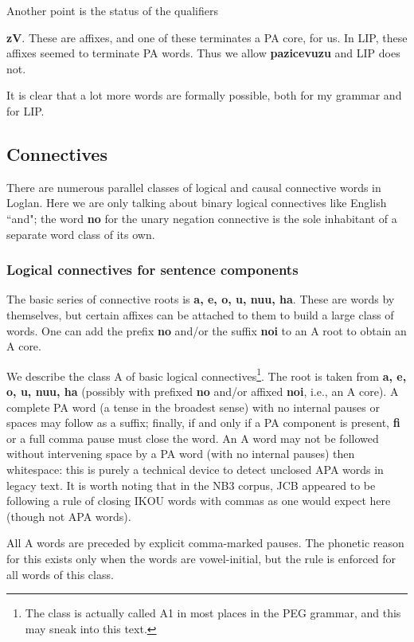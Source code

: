 \documentclass[12pt]{book}
\begin{document}
Another point is the status of the qualifiers {{\bf zV}.   These are affixes, and one of these terminates a PA core, for us.  In LIP, these affixes seemed to terminate PA words.  Thus we allow {\bf pazicevuzu} and LIP does not.

It is clear that a lot more words are formally possible, both for my grammar and for LIP.

\subsection{Connectives}

There are numerous parallel classes of logical and causal connective words in Loglan.   Here we are only talking about binary logical connectives like English ``and"; the word {\bf no} for the unary negation connective  is the sole inhabitant of a separate word class of its own.

\subsubsection{Logical connectives for sentence components}

The basic series of connective roots is {\bf a, e, o, u, nuu, ha}.   These are words by themselves, but certain affixes can be attached to them to build a large class of words.   One can add the prefix {\bf no} and/or the suffix {\bf noi} to an A root to obtain an A core.

We describe the class A of basic logical connectives\footnote{The class is actually called A1 in most places in the PEG grammar, and this may sneak into this text.}.   The root is taken from {\bf a, e, o, u, nuu, ha} (possibly with prefixed {\bf no} and/or affixed {\bf noi}, i.e., an A core).   A complete PA word (a tense in the broadest sense) with no internal pauses or spaces may follow as a suffix;  finally, if and only if a PA component is present, {\bf fi} or a full comma pause must close the word.
An A word may not be followed without intervening space by a PA word (with no internal pauses) then whitespace:  this is purely a technical device to detect unclosed APA words in legacy text.    
It is worth noting that in the NB3 corpus, JCB appeared to be following a rule of closing IKOU words with commas as one would expect here (though not APA words).

All A words are preceded by explicit comma-marked pauses.   The phonetic reason for this exists only when the words are vowel-initial, but the rule is enforced for all words of this class.

}
\end{document}
